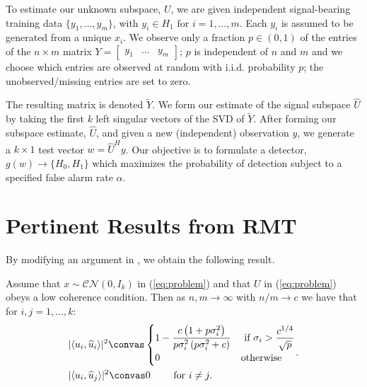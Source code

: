 To estimate our unknown subspace, $U$, we are given independent signal-bearing training data $\{y_1,\dots,y_m\}$, with $y_i\in H_1 \text{ for } i=1,\dots,m$. Each $y_i$ is assumed to be generated from a unique $x_i$. We observe only a fraction $p \in (0,1)$ of the entries of the $n \times m$ matrix $Y = \begin{bmatrix} y_1 & \ldots & y_{m} \end{bmatrix}$; $p$ is independent of $n$ and $m$ and we choose which entries are observed at random with i.i.d. probability $p$; the unobserved/missing entries are set to zero. 

The resulting matrix is denoted $\widetilde{Y}$. We form our estimate of the signal subspace $\widehat{U}$ by taking the first $k$ left singular vectors of the SVD of $\widetilde{Y}$. After forming our subspace estimate, $\widehat{U}$,  and given a new (independent) observation $y$, we generate a $k \times 1$ test vector $w=\widehat{U}^Hy$. Our objective is to formulate a detector, $g(w)\to\{H_0,H_1\}$ which maximizes the probability of detection subject to a specified false alarm rate  $\alpha$.

\section{Pertinent Results from RMT}\label{sec:rmt}
 
By modifying an argument in  \cite{benaych2011singular}, we obtain the following result. 
\begin{Th}\label{th:angles}
Assume that $x \sim \mathcal{CN}(0,I_{k})$ in (\ref{eq:problem}) and that $U$ in (\ref{eq:problem}) obeys a low coherence condition. Then as $n,m \longrightarrow \infty$ with $n/m \to c$ we have that for $i,j = 1, \ldots, k$:
\begin{equation*}
\begin{aligned}
&|\langle u_i,\widehat{u}_i\rangle|^2\convas
\begin{cases}
1-\dfrac{c\left(1+p\sigma_i^2\right)}{p\sigma_i^2\left(p\sigma_i^2 + c\right)} & \text{ if } \sigma_{i}>\dfrac{c^{1/4}}{\sqrt{p}}\\
0 & \textrm{otherwise}\\
\end{cases}\\
&|\langle u_i,\widehat{u}_j\rangle|^2\convas 0 \qquad \textrm{ for } i \neq j.\\
\end{aligned}.
\end{equation*}
\end{Th}


